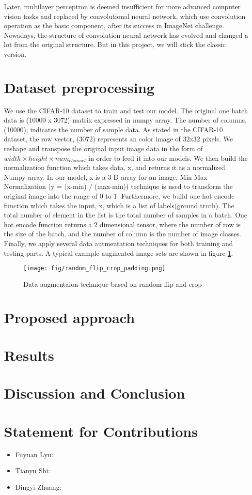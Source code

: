 \documentclass[11pt]{scrartcl}
\begin{document}
Later, multilayer perceptron is deemed insufficient for more advanced computer vision tasks and replaced by convolutional neural network\cite{krizhevsky2012imagenet}, which use convolution operation as the basic component, after its success in ImageNet challenge\cite{deng2009imagenet}. Nowadays, the structure of convolution neural network has evolved and changed a lot from the original structure. But in this project, we will stick the classic version.



\section{Dataset preprocessing}
We use the CIFAR-10 dataset to train and test our model. The original one batch data is (10000 x 3072) matrix expressed in numpy array. The number of columns, (10000), indicates the number of sample data. As stated in the CIFAR-10 dataset, the row vector, (3072) represents an color image of 32x32 pixels. 
We reshape and transpose the original input image data in the form of $width \times height \times num_{channel}$ in order to feed it into our models.
We then build the normalization function which takes data, x, and returns it as a normalized Numpy array. In our model, x is a  3-D array for an image. Min-Max Normalization (y = (x-min) / (max-min)) technique is used to transform the original image into the range of 0 to 1. 
Furthermore, we build one hot encode function which takes the input, x, which is a list of labels(ground truth). The total number of element in the list is the total number of samples in a batch. One hot encode function returns a 2 dimensional tensor, where the number of row is the size of the batch, and the number of column is the number of image classes.
Finally, we apply several data autmentation techniques for both training and testing parts. A typical example augmented image sets are shown in figure \ref{data_aug}.

\begin{figure}[H]
	\centering
	\texttt{[image: fig/random\_flip\_crop\_padding.png]}
	\caption{Data augmentaion technique based on random flip and crop}
	\label{data_aug}
\end{figure}

\section{Proposed approach}


\section{Results}


\section{Discussion and Conclusion}

\section{Statement for Contributions}
\begin{itemize}
	\item Fuyuan Lyu: 
	\item Tianyu Shi: 
	\item Dingyi Zhuang: 
\end{itemize}
\newpage



\end{document}
